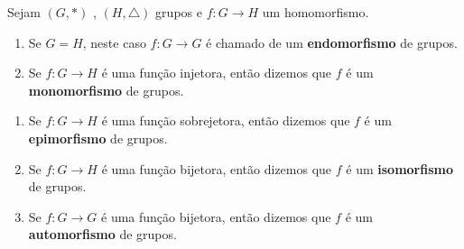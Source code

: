 \documentclass{beamer}
\begin{document}
    \begin{frame}
        \begin{observacao}
            Sejam $(G, *)$ \pause, $(H, \triangle)$ grupos \pause e $f : G \to H$ um homomorfismo. \pause

            \vspace{.5cm}

            \begin{enumerate}[label={\arabic*})]
                \item Se $G = H$, \pause neste caso $f : G \to G$ \pause é chamado de um \textbf{endomorfismo} de grupos.\pause

                \vspace{.5cm}

                \item Se $f : G \to H$ é uma função injetora, \pause então dizemos que $f$ é um \textbf{monomorfismo} de grupos.\pause

                \vspace{.5cm}

                \seti
            \end{enumerate}
        \end{observacao}
    \end{frame}

    \begin{frame}
        \begin{observacao}
            \vspace{.5cm}

            \begin{enumerate}[label={\arabic*})]
                \conti
                \item Se $f : G \to H$ é uma função sobrejetora, \pause então dizemos que $f$ é um \textbf{epimorfismo} de grupos.\pause

                \vspace{.5cm}

                \item Se $f : G \to H$ é uma função bijetora, \pause então dizemos que $f$ é um \textbf{isomorfismo} de grupos.\pause

                \vspace{.5cm}

                \item Se $f : G \to G$ é uma função bijetora, \pause então dizemos que $f$ é um \textbf{automorfismo} de grupos.

                \vspace{.5cm}

            \end{enumerate}
        \end{observacao}
    \end{frame}
\end{document}
